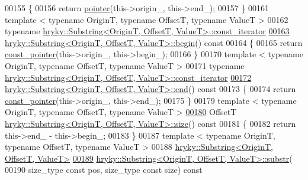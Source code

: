 \begin{DoxyCode}
00155 \{
00156     \textcolor{keywordflow}{return} \hyperlink{classhryky_1_1_offset_ptr}{pointer}(this->origin\_, this->end\_);
00157 \}
00161 \textcolor{keyword}{template} < \textcolor{keyword}{typename} OriginT, \textcolor{keyword}{typename} OffsetT, \textcolor{keyword}{typename} ValueT >
00162 \textcolor{keyword}{typename} \hyperlink{classhryky_1_1iterator_1_1random_1_1_immutable}{hryky::Substring<OriginT, OffsetT, ValueT>::const_iterator} 
\hypertarget{substring_8h_source_l00163}{}\hyperlink{classhryky_1_1_substring_a21b54707fd7805e536903fbe56228146}{00163} \hyperlink{classhryky_1_1_substring}{hryky::Substring<OriginT, OffsetT, ValueT>::begin}()\textcolor{keyword}{ const}
00164 \textcolor{keyword}{}\{
00165     \textcolor{keywordflow}{return} \hyperlink{classhryky_1_1_offset_ptr}{const_pointer}(this->origin\_, this->begin\_);
00166 \}
00170 \textcolor{keyword}{template} < \textcolor{keyword}{typename} OriginT, \textcolor{keyword}{typename} OffsetT, \textcolor{keyword}{typename} ValueT >
00171 \textcolor{keyword}{typename} \hyperlink{classhryky_1_1iterator_1_1random_1_1_immutable}{hryky::Substring<OriginT, OffsetT, ValueT>::const_iterator} 
\hypertarget{substring_8h_source_l00172}{}\hyperlink{classhryky_1_1_substring_a2c2221a0171fe303343540b47f19edd7}{00172} \hyperlink{classhryky_1_1_substring}{hryky::Substring<OriginT, OffsetT, ValueT>::end}()\textcolor{keyword}{ const}
00173 \textcolor{keyword}{}\{
00174     \textcolor{keywordflow}{return} \hyperlink{classhryky_1_1_offset_ptr}{const_pointer}(this->origin\_, this->end\_);
00175 \}
00179 \textcolor{keyword}{template} < \textcolor{keyword}{typename} OriginT, \textcolor{keyword}{typename} OffsetT, \textcolor{keyword}{typename} ValueT >
\hypertarget{substring_8h_source_l00180}{}\hyperlink{classhryky_1_1_substring_a4af5f4d8501d2a5032ee6850424859ac}{00180} OffsetT \hyperlink{classhryky_1_1_substring}{hryky::Substring<OriginT, OffsetT, ValueT>::size}()\textcolor{keyword}{ const}
00181 \textcolor{keyword}{}\{
00182     \textcolor{keywordflow}{return} this->end\_ - this->begin\_;
00183 \}
00187 \textcolor{keyword}{template} < \textcolor{keyword}{typename} OriginT, \textcolor{keyword}{typename} OffsetT, \textcolor{keyword}{typename} ValueT >
00188 \hyperlink{classhryky_1_1_substring}{hryky::Substring<OriginT, OffsetT, ValueT>} 
\hypertarget{substring_8h_source_l00189}{}\hyperlink{classhryky_1_1_substring_a55f9c969b225a603e1b4d4021ecb738b}{00189} \hyperlink{classhryky_1_1_substring}{hryky::Substring<OriginT, OffsetT, ValueT>::substr}(
00190     size\_type \textcolor{keyword}{const} pos, size\_type \textcolor{keyword}{const} size)\textcolor{keyword}{ const}

\end{DoxyCode}
